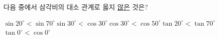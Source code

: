 다음 중에서 삼각비의 대소 관계로 옳지 \underline{않은} 것은?
\begin{choicesii}{$\sin 20^\circ<\sin 70^\circ$}{$\sin 30^\circ<\cos 30^\circ$}{$\cos 30^\circ<\cos 50^\circ$}{$\tan 20^\circ<\tan 70^\circ$}{$\tan 0^\circ<\cos 0^\circ$}\end{choicesii}
